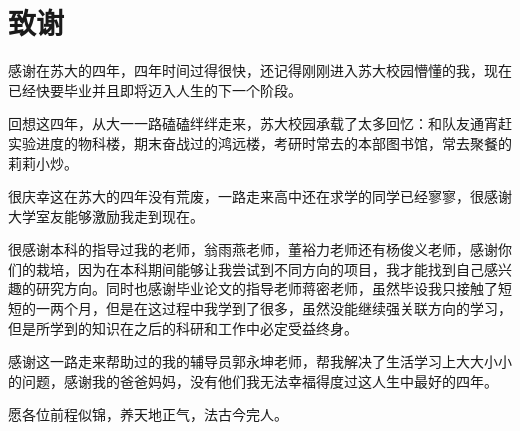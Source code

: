 \section*{致谢}

感谢在苏大的四年，四年时间过得很快，还记得刚刚进入苏大校园懵懂的我，现在已经快要毕业并且即将迈入人生的下一个阶段。

回想这四年，从大一一路磕磕绊绊走来，苏大校园承载了太多回忆：和队友通宵赶实验进度的物科楼，期末奋战过的鸿远楼，考研时常去的本部图书馆，常去聚餐的莉莉小炒。

很庆幸这在苏大的四年没有荒废，一路走来高中还在求学的同学已经寥寥，很感谢大学室友能够激励我走到现在。

很感谢本科的指导过我的老师，翁雨燕老师，董裕力老师还有杨俊义老师，感谢你们的栽培，因为在本科期间能够让我尝试到不同方向的项目，我才能找到自己感兴趣的研究方向。同时也感谢毕业论文的指导老师蒋密老师，虽然毕设我只接触了短短的一两个月，但是在这过程中我学到了很多，虽然没能继续强关联方向的学习，但是所学到的知识在之后的科研和工作中必定受益终身。

感谢这一路走来帮助过的我的辅导员郭永坤老师，帮我解决了生活学习上大大小小的问题，感谢我的爸爸妈妈，没有他们我无法幸福得度过这人生中最好的四年。

愿各位前程似锦，养天地正气，法古今完人。

